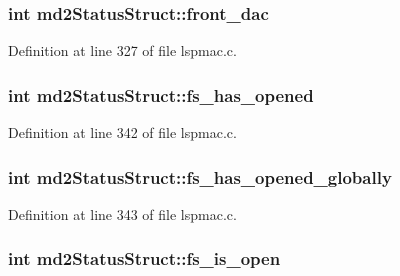 \hypertarget{structmd2StatusStruct_a3be73c48b09190241a2bcb801af5b97c}{
\subsubsection[{front\-\_\-dac}]{\setlength{\rightskip}{0pt plus 5cm}int md2\-Status\-Struct\-::front\-\_\-dac}}\label{structmd2StatusStruct_a3be73c48b09190241a2bcb801af5b97c}


Definition at line 327 of file lspmac.\-c.

\hypertarget{structmd2StatusStruct_ab961c2ba24a1a8c95a88dec25319e712}{
\subsubsection[{fs\-\_\-has\-\_\-opened}]{\setlength{\rightskip}{0pt plus 5cm}int md2\-Status\-Struct\-::fs\-\_\-has\-\_\-opened}}\label{structmd2StatusStruct_ab961c2ba24a1a8c95a88dec25319e712}


Definition at line 342 of file lspmac.\-c.

\hypertarget{structmd2StatusStruct_ac95696b7ed35ccfdfb6aeeee879bdb65}{
\subsubsection[{fs\-\_\-has\-\_\-opened\-\_\-globally}]{\setlength{\rightskip}{0pt plus 5cm}int md2\-Status\-Struct\-::fs\-\_\-has\-\_\-opened\-\_\-globally}}\label{structmd2StatusStruct_ac95696b7ed35ccfdfb6aeeee879bdb65}


Definition at line 343 of file lspmac.\-c.

\hypertarget{structmd2StatusStruct_aca3722c109e6646bd41fb269a32261f2}{
\subsubsection[{fs\-\_\-is\-\_\-open}]{\setlength{\rightskip}{0pt plus 5cm}int md2\-Status\-Struct\-::fs\-\_\-is\-\_\-open}}\label{structmd2StatusStruct_aca3722c109e6646bd41fb269a32261f2}


